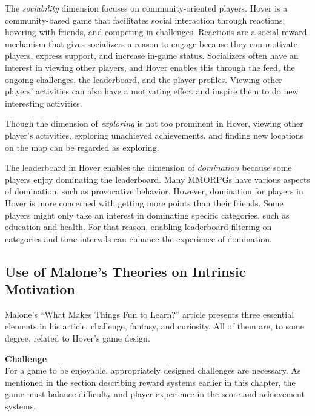 The \textit{sociability} dimension focuses on community-oriented players. Hover is a community-based game that facilitates social interaction through reactions, hovering with friends, and competing in challenges. Reactions are a social reward mechanism that gives socializers a reason to engage because they can motivate players, express support, and increase in-game status. Socializers often have an interest in viewing other players, and Hover enables this through the feed, the ongoing challenges, the leaderboard, and the player profiles. Viewing other players’ activities can also have a motivating effect and inspire them to do new interesting activities. 

Though the dimension of \textit{exploring} is not too prominent in Hover, viewing other player’s activities, exploring unachieved achievements, and finding new locations on the map can be regarded as exploring.

The leaderboard in Hover enables the dimension of \textit{domination} because some players enjoy dominating the leaderboard. Many MMORPGs have various aspects of domination, such as provocative behavior. However, domination for players in Hover is more concerned with getting more points than their friends. Some players might only take an interest in dominating specific categories, such as education and health. For that reason, enabling leaderboard-filtering on categories and time intervals can enhance the experience of domination.

\subsection{Use of Malone’s Theories on Intrinsic Motivation}
Malone’s “What Makes Things Fun to Learn?” article presents three essential elements in his article: challenge, fantasy, and curiosity. All of them are, to some degree, related to Hover’s game design.

\textbf{Challenge} \\
For a game to be enjoyable, appropriately designed challenges are necessary. As mentioned in the section describing reward systems earlier in this chapter, the game must balance difficulty and player experience in the score and achievement systems.

